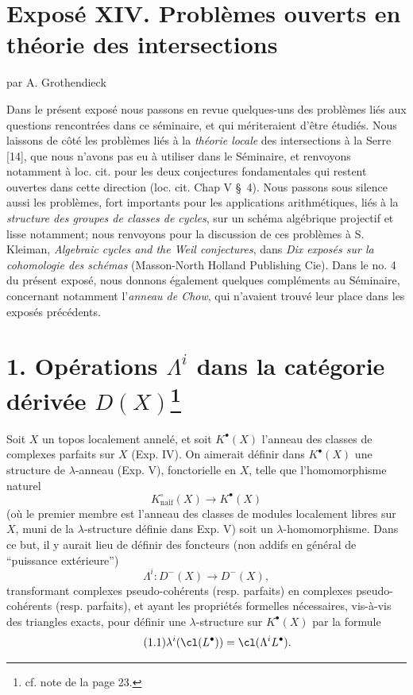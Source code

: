 \section*{Exposé XIV. Problèmes ouverts en théorie des intersections}
\begin{center}
par A. Grothendieck
\end{center}

Dans le présent exposé nous passons en revue quelques-uns des problèmes liés aux questions rencontrées dans ce séminaire, et qui mériteraient d'être étudiés. Nous laissons de côté les problèmes liés à la \emph{théorie locale} des intersections à la Serre [14], que nous n'avons pas eu à utiliser dans le Séminaire, et renvoyons notamment à loc. cit. pour les deux conjectures fondamentales qui restent ouvertes dans cette direction (loc. cit. Chap V \S~4). Nous passons sous silence aussi les problèmes, fort importants pour les applications arithmétiques, liés à la \emph{structure des groupes de classes de cycles}, sur un schéma algébrique projectif et lisse notamment; nous renvoyons pour la discussion de ces problèmes à S. Kleiman, \emph{Algebraic cycles and the Weil conjectures}, dans \emph{Dix exposés sur la cohomologie des schémas} (Masson-North Holland Publishing Cie). Dans le no. 4 du présent exposé, nous donnons également quelques compléments au Séminaire, concernant notamment l'\emph{anneau de Chow}, qui n'avaient trouvé leur place dans les exposés précédents.

\section*{1. Opérations $\Lambda^i$ dans la catégorie dérivée $D(X)$\footnote{cf. note de la page 23.}}

Soit $X$ un topos localement annelé, et soit $K^\bullet(X)$ l'anneau des classes de complexes parfaits sur $X$ (Exp. IV). On aimerait définir dans $K^\bullet(X)$ une structure de $\lambda$-anneau (Exp. V), fonctorielle en $X$, telle que l'homomorphisme naturel
\[
 K^\circ_{\mathrm{naif}}(X)\longrightarrow K^\bullet(X)
\]
(où le premier membre est l'anneau des classes de modules localement libres sur $X$, muni de la $\lambda$-structure définie dans Exp. V) soit un $\lambda$-homomorphisme. Dans ce but, il y aurait lieu de définir des foncteurs (non addifs en général de ``puissance extérieure'')
\[
 \Lambda^i:D^-(X)\longrightarrow D^-(X),
\]
transformant complexes pseudo-cohérents (resp. parfaits) en complexes pseudo-cohérents (resp. parfaits), et ayant les propriétés formelles nécessaires, vis-à-vis des triangles exacts, pour définir une $\lambda$-structure sur $K^\bullet(X)$ par la formule
\begin{equation}\tag{1.1}
 \lambda^i(\cl(L^\bullet))=\cl(\Lambda^i L^\bullet).
\end{equation}

